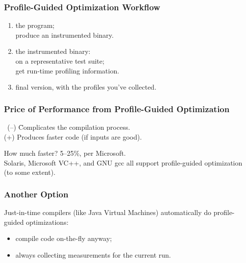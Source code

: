 \begin{frame}
  \frametitle{Profile-Guided Optimization Workflow}

  
\begin{enumerate}
\item {} the program; \\
\hspace*{1em} produce an instrumented binary.
\item {} the instrumented binary:\\
\hspace*{1em} on a representative test suite;\\
\hspace*{1em} get run-time profiling information.\\
\item {} final version, with the profiles you've
collected.
\end{enumerate}

  

\end{frame}

\begin{frame}
  \frametitle{Price of Performance from Profile-Guided Optimization}
  
\begin{tabbing}
    ~\!(--) \hspace*{.4em} \= Complicates the compilation process.\\
    (+) \> Produces faster code (if inputs are good).\\[1em]
\end{tabbing}

    How much faster? 5--25\%, per Microsoft.\\[1em]

 Solaris, Microsoft VC++, and GNU gcc all
 support profile-guided optimization (to some extent).

  

\end{frame}

\begin{frame}
  \frametitle{Another Option}
  
    Just-in-time compilers (like Java Virtual Machines)
    automatically do profile-guided optimizations:
\begin{itemize}
\item compile code on-the-fly anyway;
\item always collecting measurements for the current run.
\end{itemize}


  

\end{frame}

